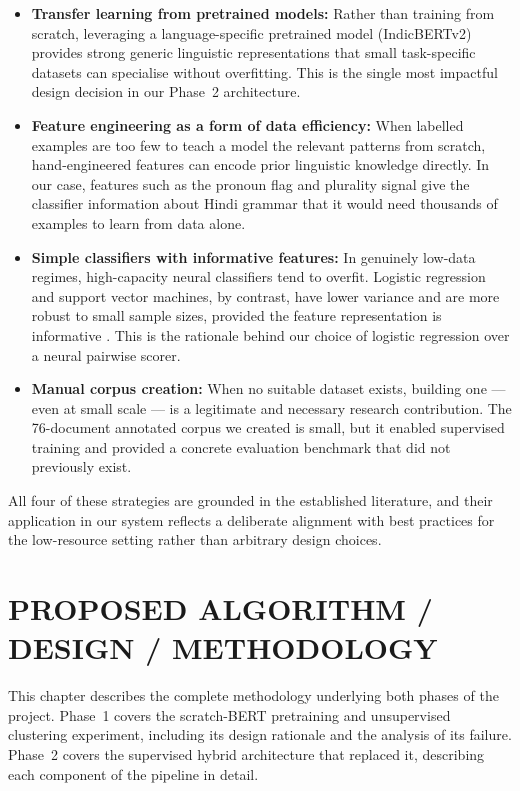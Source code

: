 \documentclass[12pt,a4paper]{report}
\begin{document}
\begin{itemize}
    \item \textbf{Transfer learning from pretrained models:} Rather than training from scratch, leveraging a language-specific pretrained model (IndicBERTv2) provides strong generic linguistic representations that small task-specific datasets can specialise without overfitting. This is the single most impactful design decision in our Phase~2 architecture.

    \item \textbf{Feature engineering as a form of data efficiency:} When labelled examples are too few to teach a model the relevant patterns from scratch, hand-engineered features can encode prior linguistic knowledge directly. In our case, features such as the pronoun flag and plurality signal give the classifier information about Hindi grammar that it would need thousands of examples to learn from data alone.

    \item \textbf{Simple classifiers with informative features:} In genuinely low-data regimes, high-capacity neural classifiers tend to overfit. Logistic regression and support vector machines, by contrast, have lower variance and are more robust to small sample sizes, provided the feature representation is informative \cite{lappin1994algorithm}. This is the rationale behind our choice of logistic regression over a neural pairwise scorer.

    \item \textbf{Manual corpus creation:} When no suitable dataset exists, building one --- even at small scale --- is a legitimate and necessary research contribution. The 76-document annotated corpus we created is small, but it enabled supervised training and provided a concrete evaluation benchmark that did not previously exist.
\end{itemize}

All four of these strategies are grounded in the established literature, and their application in our system reflects a deliberate alignment with best practices for the low-resource setting rather than arbitrary design choices.


\chapter{PROPOSED ALGORITHM / DESIGN / METHODOLOGY}

This chapter describes the complete methodology underlying both phases of the project. Phase~1 covers the scratch-BERT pretraining and unsupervised clustering experiment, including its design rationale and the analysis of its failure. Phase~2 covers the supervised hybrid architecture that replaced it, describing each component of the pipeline in detail.
\end{document}
